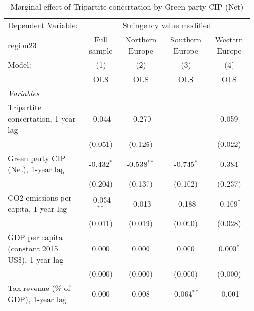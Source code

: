 
\begin{table}[htbp]
   \caption{Marginal effect of Tripartite concertation by Green party CIP (Net)}
   \centering
   \begin{tabular}{lcccc}
      \toprule
      Dependent Variable: & \multicolumn{4}{c}{Stringency value modified}\\
      region23                                                                & Full sample   & Northern Europe & Southern Europe & Western Europe \\   
      Model:                                                                  & (1)           & (2)             & (3)             & (4)\\  
                                                                              &  OLS          & OLS             & OLS             & OLS\\  
      \midrule
      \emph{Variables}\\
      Tripartite concertation, 1-year lag                                     & -0.044        & -0.270          &                 & 0.059\\   
                                                                              & (0.051)       & (0.126)         &                 & (0.022)\\   
      Green party CIP (Net), 1-year lag                                       & -0.432$^{*}$  & -0.538$^{**}$   & -0.745$^{*}$    & 0.384\\   
                                                                              & (0.204)       & (0.137)         & (0.102)         & (0.237)\\   
      CO2 emissions per capita, 1-year lag                                    & -0.034$^{**}$ & -0.013          & -0.188          & -0.109$^{*}$\\   
                                                                              & (0.011)       & (0.019)         & (0.090)         & (0.028)\\   
      GDP per capita (constant 2015 US\$), 1-year lag                         & 0.000         & 0.000           & 0.000           & 0.000$^{*}$\\   
                                                                              & (0.000)       & (0.000)         & (0.000)         & (0.000)\\   
      Tax revenue (\% of GDP), 1-year lag                                     & 0.000         & 0.008           & -0.064$^{**}$   & -0.001\\   

\end{tabular}
\end{table}
